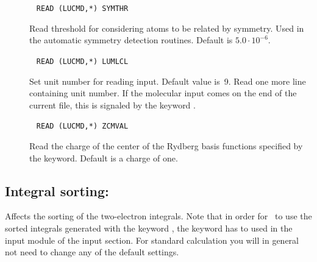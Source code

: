 \begin{description}
\item[]\verb| |\newline
\verb|READ (LUCMD,*) SYMTHR|

Read threshold for considering atoms to be related by symmetry. Used
in the automatic symmetry detection routines. Default is $5.0\cdot
10^{-6}$.

\item[]\verb| |\newline
\verb|READ (LUCMD,*) LUMLCL|

Set unit number for reading input. Default value is~9.  Read one more
line containing unit number. If the molecular input comes on the
end of the current file, this is signaled by the keyword .

\item[]\verb| |\newline
\verb|READ (LUCMD,*) ZCMVAL|

Read the charge of the center of the Rydberg basis functions specified
by the  keyword. Default is a charge of one.

\end{description}

\subsection{Integral sorting: }

Affects the sorting of the two-electron integrals. Note that in order for \sir\ to use the sorted integrals
generated with the keyword , the keyword
 has to used in the  input
module of the  input section. For standard
calculation you will in general not need to change any of the
default settings.

